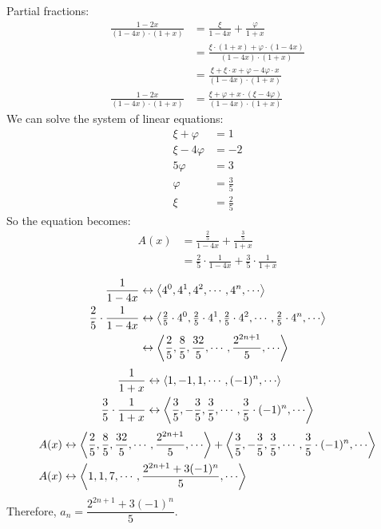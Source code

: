 \documentclass[12pt]{article}
\newcommand{\+}{\mkern2mu}
\begin{document}
\noindent
Partial fractions:
\begin{align*}
\frac{1 - 2x}{(1-4x) \cdot (1+x)} &= \frac{\xi}{1-4x} + \frac{\varphi}{1+x} \\
&= \frac{\xi \cdot (1+x) + \varphi \cdot (1-4x)}{(1-4x) \cdot (1+x)} \\
&= \frac{\xi + \xi \cdot x + \varphi - 4 \varphi \cdot x}{(1-4x) \cdot (1+x)} \\
\frac{1 - 2x}{(1-4x) \cdot (1+x)} &= \frac{\xi + \varphi + x \cdot (\xi  - 4 \varphi)}{(1-4x) \cdot (1+x)}
\end{align*}
We can solve the system of linear equations:
\begin{align*}
\xi + \varphi &= 1 \\
\xi -4 \varphi &= -2 \\
5 \varphi &= 3 \\
\varphi &= \tfrac{3}{5} \\
\xi &= \tfrac{2}{5}
\end{align*}
So the equation becomes:
\begin{align*}
A(x) &= \frac{\tfrac{2}{5}}{1-4x} + \frac{\tfrac{3}{5}}{1+x} \\
&= \frac{2}{5} \cdot \frac{1}{1-4x} + \frac{3}{5} \cdot \frac{1}{1+x}
\end{align*}
\begin{align*}
\frac{1}{1-4x} &\leftrightarrow \Braket{4^0, 4^1, 4^2, \cdots, 4^n, \cdots} \\
\frac{2}{5} \cdot \frac{1}{1-4x} &\leftrightarrow \Braket{\tfrac{2}{5} \cdot 4^0, \tfrac{2}{5} \cdot 4^1, \tfrac{2}{5} \cdot 4^2, \cdots, \tfrac{2}{5} \cdot 4^n, \cdots} \\
&\leftrightarrow \Braket{\frac{2}{5}, \frac{8}{5}, \frac{32}{5}, \cdots, \frac{2^{2n+1}}{5}, \cdots}
\end{align*}
\begin{align*}
\frac{1}{1+x} &\leftrightarrow \Braket{1, -1, 1, \cdots, (-1)^n, \cdots} \\
\frac{3}{5} \cdot \frac{1}{1+x} &\leftrightarrow \Braket{\frac{3}{5}, -\frac{3}{5}, \frac{3}{5}, \cdots, \frac{3}{5} \cdot (-1)^n, \cdots}
\end{align*}
\begin{align*}
A(x) &\leftrightarrow \Braket{\frac{2}{5}, \frac{8}{5}, \frac{32}{5}, \cdots, \frac{2^{2n+1}}{5}, \cdots} + \Braket{\frac{3}{5}, -\frac{3}{5}, \frac{3}{5}, \cdots, \frac{3}{5} \cdot (-1)^n, \cdots} \\
A(x) &\leftrightarrow \Braket{1, 1, 7, \cdots, \frac{2^{2n+1} + 3(-1)^n}{5}, \cdots}
\end{align*}
Therefore, $a_n = \dfrac{2^{2n+1} + 3(-1)^n}{5}$.
\end{document}
